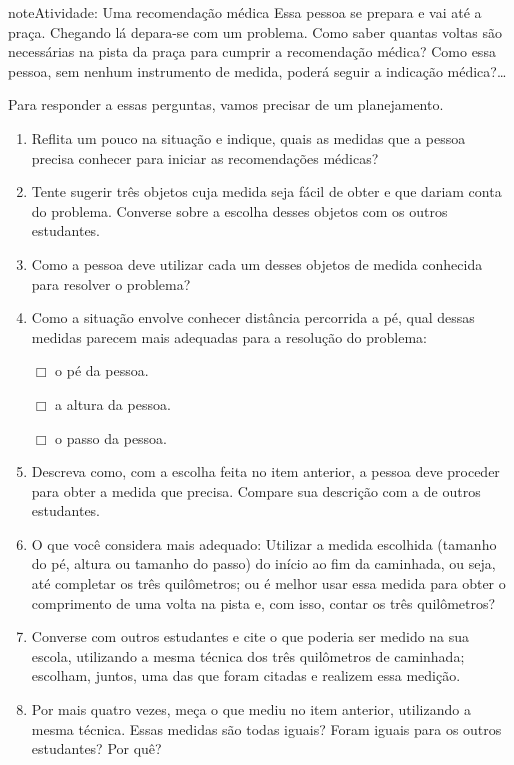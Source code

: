 \begin{sphinxadmonition}{note}{Atividade: Uma recomendação médica}
Essa pessoa se prepara e vai até a praça. Chegando lá depara-se com um problema. Como saber quantas voltas são necessárias na pista da praça para cumprir a recomendação médica? Como essa pessoa, sem nenhum instrumento de medida, poderá seguir a indicação médica?…

Para responder a essas perguntas, vamos precisar de um planejamento.
\begin{enumerate}
\item {} 
Reflita um pouco na situação e indique, quais as medidas que a pessoa precisa conhecer para iniciar as recomendações médicas?

\item {} 
Tente sugerir três objetos cuja medida seja fácil de obter e que dariam conta do problema. Converse sobre a escolha desses objetos com os outros estudantes.

\item {} 
Como a pessoa deve utilizar cada um desses objetos de medida conhecida para resolver o problema?

\item {} 
Como a situação envolve conhecer distância percorrida a pé, qual dessas medidas parecem mais adequadas para a resolução do problema:

\(\Box\) o pé da pessoa.

\(\Box\) a altura da pessoa.

\(\Box\) o passo da pessoa.

\item {} 
Descreva como, com a escolha feita no item anterior, a pessoa deve proceder para obter a medida que precisa. Compare sua descrição com a de outros estudantes.

\item {} 
O que você considera mais adequado: Utilizar a medida escolhida (tamanho do pé, altura ou tamanho do passo) do início ao fim da caminhada, ou seja, até completar os três quilômetros; ou é melhor usar essa medida para obter o comprimento de uma volta na pista e, com isso, contar os três quilômetros?

\item {} 
Converse com outros estudantes e cite o que poderia ser medido na sua escola, utilizando a mesma técnica dos três quilômetros de caminhada; escolham, juntos, uma das que foram citadas e realizem essa medição.

\item {} 
Por mais quatro vezes, meça o que mediu no item anterior, utilizando a mesma técnica. Essas medidas são todas iguais? Foram iguais para os outros estudantes? Por quê?


\end{enumerate}
\end{sphinxadmonition}
